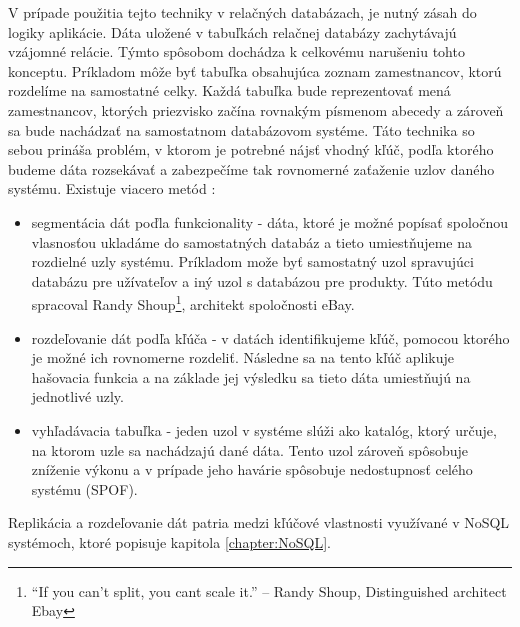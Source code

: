 \documentclass[11pt,twoside,a4paper]{book}
\begin{document}
V prípade použitia tejto techniky v relačných databázach, je nutný zásah do logiky aplikácie. Dáta uložené v tabuľkách relačnej databázy zachytávajú vzájomné relácie. Týmto spôsobom dochádza k celkovému narušeniu tohto konceptu. Príkladom môže byť tabuľka obsahujúca zoznam zamestnancov, ktorú rozdelíme na samostatné celky. Každá tabuľka bude reprezentovať mená zamestnancov, ktorých priezvisko začína rovnakým písmenom abecedy a zároveň sa bude nachádzať na samostatnom databázovom systéme. Táto technika so sebou prináša problém, v ktorom je potrebné nájsť vhodný kľúč, podľa ktorého budeme dáta rozsekávať a zabezpečíme tak rovnomerné zaťaženie uzlov daného systému. Existuje viacero metód \cite{hewitt2010cassandra}:
\begin{itemize}
 \item 
      segmentácia dát poďla funkcionality - dáta, ktoré je možné popísať spoločnou vlasnosťou ukladáme do samostatných databáz a tieto umiestňujeme na rozdielné uzly systému. Príkladom može byť samostatný uzol spravujúci databázu pre užívateľov a iný uzol s databázou pre produkty. Túto metódu spracoval Randy Shoup\footnote{“If you can’t split, you cant scale it.” -- Randy Shoup, Distinguished architect Ebay}\cite{ebayShard}, architekt spoločnosti eBay.
  \item
      rozdeľovanie dát podľa kľúča - v datách identifikujeme kľúč, pomocou ktorého je možné ich rovnomerne rozdeliť. Následne sa na tento kľúč aplikuje hašovacia funkcia a na základe jej výsledku sa tieto dáta umiestňujú na jednotlivé uzly.
  \item
      vyhľadávacia tabuľka - jeden uzol v systéme slúži ako katalóg, ktorý určuje, na ktorom uzle sa nachádzajú dané dáta. Tento uzol zároveň spôsobuje zníženie výkonu a v prípade jeho havárie spôsobuje nedostupnosť celého systému (SPOF).
\end{itemize}

Replikácia a rozdeľovanie dát patria medzi kľúčové vlastnosti využívané v NoSQL systémoch, ktoré popisuje kapitola \ref{chapter:NoSQL}.


\end{document}
